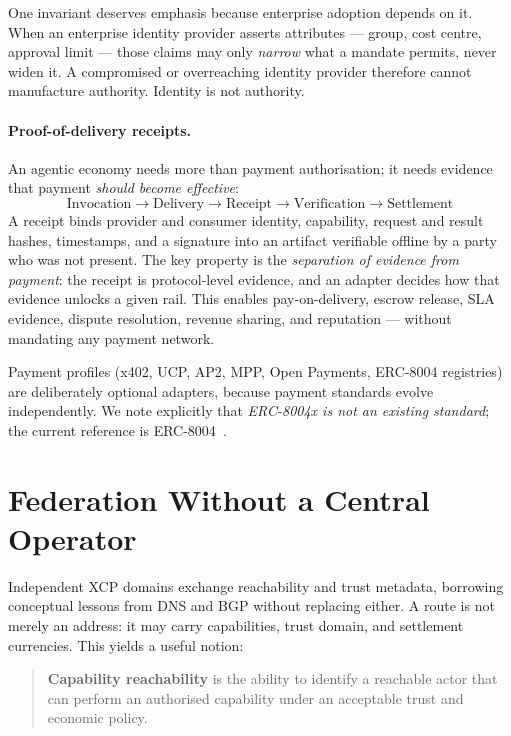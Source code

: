 \documentclass[11pt]{article}
\begin{document}
One invariant deserves emphasis because enterprise adoption depends on it. When
an enterprise identity provider asserts attributes --- group, cost centre,
approval limit --- those claims may only \emph{narrow} what a mandate permits,
never widen it. A compromised or overreaching identity provider therefore cannot
manufacture authority. Identity is not authority.

\paragraph{Proof-of-delivery receipts.} An agentic economy needs more than
payment authorisation; it needs evidence that payment \emph{should become
effective}:
\[
\text{Invocation} \rightarrow \text{Delivery} \rightarrow \text{Receipt}
\rightarrow \text{Verification} \rightarrow \text{Settlement}
\]
A receipt binds provider and consumer identity, capability, request and result
hashes, timestamps, and a signature into an artifact verifiable offline by a
party who was not present. The key property is the \emph{separation of evidence
from payment}: the receipt is protocol-level evidence, and an adapter decides how
that evidence unlocks a given rail. This enables pay-on-delivery, escrow release,
SLA evidence, dispute resolution, revenue sharing, and reputation --- without
mandating any payment network.

Payment profiles (x402, UCP, AP2, MPP, Open Payments, ERC-8004 registries) are
deliberately optional adapters, because payment standards evolve independently.
We note explicitly that \emph{ERC-8004x is not an existing standard}; the current
reference is ERC-8004~\cite{erc8004}.

\section{Federation Without a Central Operator}

Independent XCP domains exchange reachability and trust metadata, borrowing
conceptual lessons from DNS and BGP without replacing either. A route is not
merely an address: it may carry capabilities, trust domain, and settlement
currencies. This yields a useful notion:

\begin{quote}
\textbf{Capability reachability} is the ability to identify a reachable actor
that can perform an authorised capability under an acceptable trust and economic
policy.
\end{quote}
\end{document}
